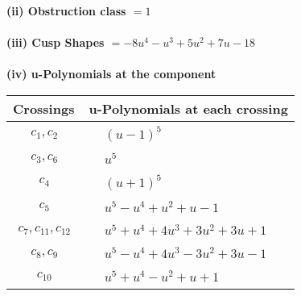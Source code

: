 \documentclass[1p]{elsarticle_modified}
\theoremstyle{definition}
\begin{document}
\flushleft \textbf{(ii) Obstruction class $= 1$}\\~\\
\flushleft \textbf{(iii) Cusp Shapes $= -8 u^4- u^3+5 u^2+7 u-18$}\\~\\
\newpage\renewcommand{\arraystretch}{1}
\flushleft \textbf{(iv) u-Polynomials at the component}\newline \\
\begin{tabular}{m{50pt}|m{274pt}}
Crossings & \hspace{64pt}u-Polynomials at each crossing \\
\hline $$\begin{aligned}c_{1},c_{2}\end{aligned}$$&$\begin{aligned}
&(u-1)^5
\end{aligned}$\\
\hline $$\begin{aligned}c_{3},c_{6}\end{aligned}$$&$\begin{aligned}
&u^5
\end{aligned}$\\
\hline $$\begin{aligned}c_{4}\end{aligned}$$&$\begin{aligned}
&(u+1)^5
\end{aligned}$\\
\hline $$\begin{aligned}c_{5}\end{aligned}$$&$\begin{aligned}
&u^5- u^4+u^2+u-1
\end{aligned}$\\
\hline $$\begin{aligned}c_{7},c_{11},c_{12}\end{aligned}$$&$\begin{aligned}
&u^5+u^4+4 u^3+3 u^2+3 u+1
\end{aligned}$\\
\hline $$\begin{aligned}c_{8},c_{9}\end{aligned}$$&$\begin{aligned}
&u^5- u^4+4 u^3-3 u^2+3 u-1
\end{aligned}$\\
\hline $$\begin{aligned}c_{10}\end{aligned}$$&$\begin{aligned}
&u^5+u^4- u^2+u+1
\end{aligned}$\\
\hline
\end{tabular}\\~\\
\end{document}
